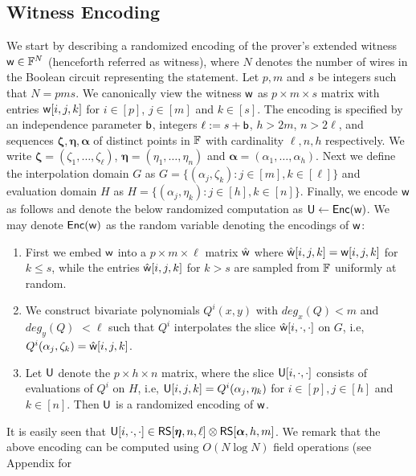 


\subsection{Witness Encoding}\label{sec:witencoding}
We start by describing a randomized encoding of the prover's extended witness $\mathsf{w}\in \mathbb{F}^N$ (henceforth referred as witness), where $N$ denotes the number of wires in the Boolean circuit representing the statement. Let $p,m$ and
$s$ be integers such that $N=pms$. We canonically view the
witness $\mathsf{w}$ 
as $p\times m\times s$ matrix with entries $\mathsf{w}[i,j,k]$ for $i\in [p]$,
$j\in [m]$ and $k\in [s]$. The encoding is specified by an independence 
parameter $\mathsf{b}$, integers $\ell := s+\mathsf{b}$, $h>2m$, $n>2\ell$, and sequences
$\bm{\zeta},\bm{\eta},\bm{\alpha}$ of distinct points in $\mathbb{F}$ with cardinality 
$\ell,n,h$ respectively. We write $\bm{\zeta}=(\zeta_1,\ldots,\zeta_\ell)$,
$\bm{\eta}=(\eta_1,\ldots,\eta_n)$ and $\bm{\alpha}=(\alpha_1,\ldots,\alpha_h)$. 
Next we define the interpolation domain $G$ as $G=\{(\alpha_j,\zeta_k): j\in[m],
k\in [\ell]\}$ and evaluation domain $H$ as $H=\{(\alpha_j,\eta_k): j\in [h],
k\in [n]\}$. Finally, we encode $\mathsf{w}$ as follows and denote the below randomized computation as $\mathsf{U}\gets \mathsf{Enc}(\mathsf{w})$.
 We may denote $\mathsf{Enc}(\mathsf{w})$ as the random variable denoting the encodings of $\mathsf{w}$:
\begin{enumerate}[{\rm (i)}]
\item First we embed $\mathsf{w}$ into a $p\times m\times \ell$ matrix $\hat{\mathsf{w}}$
where $\hat{\mathsf{w}}[i,j,k]=\mathsf{w}[i,j,k]$ for $k\leq s$, while the entries
$\hat{\mathsf{w}}[i,j,k]$ for $k>s$ are sampled from $\mathbb{F}$ uniformly at random.
\item We construct bivariate polynomials $Q^i(x,y)$ with $deg_x(Q)<m$ and
$deg_y(Q) $ $<\ell$ such that $Q^i$ interpolates the slice
$\hat{\mathsf{w}}[i,\cdot,\cdot]$ on $G$, i.e,
$Q^i(\alpha_j,\zeta_k)=\hat{\mathsf{w}}[i,j,k]$. 
\item Let $\mathsf{U}$ denote the $p\times h\times n$ matrix, where the slice
$\mathsf{U}[i,\cdot,\cdot]$ consists of evaluations of $Q^i$ on $H$, i.e,
$\mathsf{U}[i,j,k]=Q^i(\alpha_j,\eta_k)$ for $i\in [p], j\in [h]$ and $k\in [n]$.
Then $\mathsf{U}$ is a randomized encoding of $\mathsf{w}$.
\end{enumerate}
 It is easily seen
that $\mathsf{U}[i,\cdot,\cdot]\in \mathsf{RS}[\bm{\eta},n,\ell]\otimes \mathsf{RS}[\bm{\alpha},h,m]$. We remark that the above
encoding can be computed using $O(N\log N)$ field operations (see Appendix for
